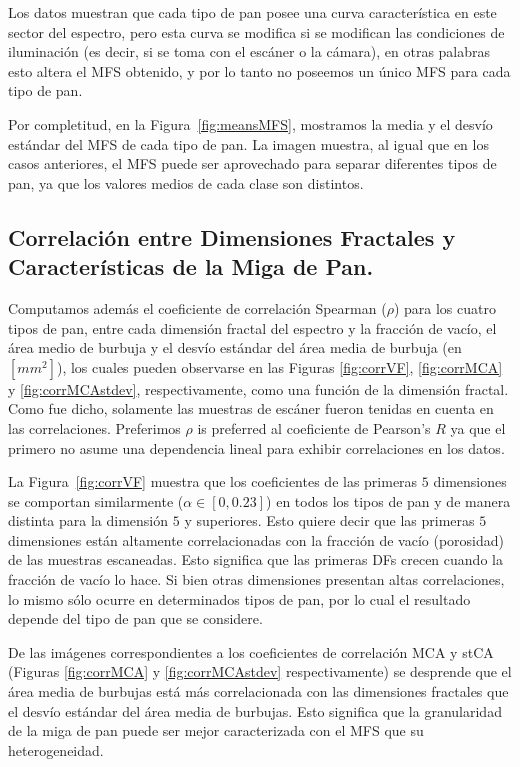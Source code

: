 Los datos muestran que cada tipo de pan posee una curva característica en este sector del espectro, pero esta curva se modifica si se modifican las condiciones de iluminación (es decir, si se toma con el escáner o la cámara), en otras palabras esto altera el MFS obtenido, y por lo tanto no poseemos un único MFS para cada tipo de pan. 

Por completitud, en la Figura~\ref{fig:meansMFS}, mostramos la media y el desvío estándar del MFS de cada tipo de pan. La imagen muestra, al igual que en los casos anteriores, el MFS puede ser aprovechado para separar diferentes tipos de pan, ya que los valores medios de cada clase son distintos.

\subsection{Correlación entre Dimensiones Fractales y Características de la Miga de Pan.}

Computamos además el coeficiente de correlación Spearman ($\rho$) para los cuatro tipos de pan, entre cada dimensión fractal del espectro y la fracción de vacío, el área medio de burbuja y el desvío estándar del área media de burbuja (en $[mm^{2}]$), los cuales pueden observarse en las Figuras \ref{fig:corrVF}, \ref{fig:corrMCA} y \ref{fig:corrMCAstdev}, respectivamente, como una función de la dimensión fractal. Como fue dicho, solamente las muestras de escáner fueron tenidas en cuenta en las correlaciones. Preferimos $\rho$ is preferred al coeficiente de Pearson's $R$ ya que el primero no asume una dependencia lineal para exhibir correlaciones en los datos.

La Figura~\ref{fig:corrVF} muestra que los coeficientes de las primeras $5$ dimensiones se comportan similarmente ($\alpha \in [0,0.23]$) en todos los tipos de pan y de manera distinta para la dimensión $5$ y superiores. Esto quiere decir que las primeras $5$ dimensiones están altamente correlacionadas con la fracción de vacío (porosidad) de las muestras escaneadas. Esto significa que las primeras DFs crecen cuando la fracción de vacío lo hace. Si bien otras dimensiones presentan altas correlaciones, lo mismo sólo ocurre en determinados tipos de pan, por lo cual el resultado depende del tipo de pan que se considere.

De las imágenes correspondientes a los coeficientes de correlación MCA y stCA (Figuras \ref{fig:corrMCA} y \ref{fig:corrMCAstdev} respectivamente) se desprende que el área media de burbujas está más correlacionada con las dimensiones fractales que el desvío estándar del área media de burbujas. Esto significa que la granularidad de la miga de pan puede ser mejor caracterizada con el MFS que su heterogeneidad.

